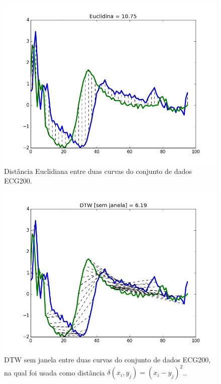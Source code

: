 \begin{figure}
		\centering
		\includegraphics[width=.95\linewidth]{figuras/ECG200_dtw_euclidiana.png}
		\caption{Distância Euclidiana entre duas curvas do conjunto de dados ECG200.}
		\label{fig:sfig1}
\end{figure}
\begin{figure}
		\centering
		\includegraphics[width=.95\linewidth]{figuras/ECG200_dtw_nowindow.png}
		\caption{DTW sem janela entre duas curvas do conjunto de dados ECG200, na qual foi usada como distância $\delta(x_i,y_j) = (x_i-y_j)^2$..}
		\label{fig:sfig2}
\end{figure}
